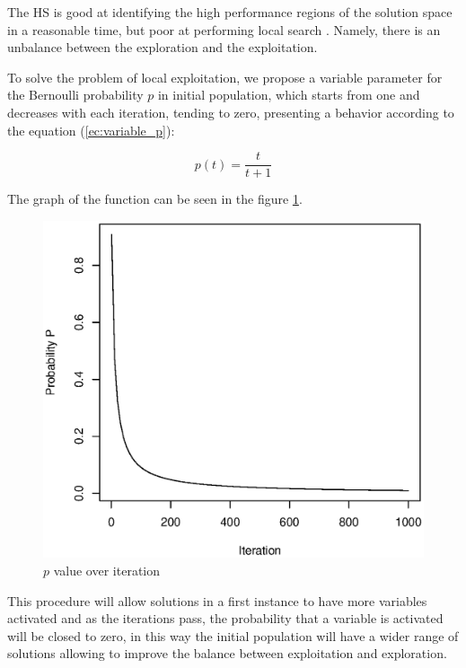 The HS is good at identifying the high performance regions of the solution space in a reasonable time, but poor at performing local search \cite{DBLP:journals/eswa/XiangALHZ14}. Namely, there is an unbalance between the exploration and the exploitation. 
 
To solve the problem of local exploitation, we propose a variable parameter for the Bernoulli probability $p$ in initial population, which starts from one and decreases with each iteration, tending to zero, presenting a behavior according to the equation (\ref{ec:variable_p}):

\begin{equation} \label{ec:variable_p} 
p(t) = \frac{t}{t+1}
\end{equation}	

The graph of the function can be seen in the figure \ref{fig:pvalue}.\\

\begin{figure}[H]
\centering
\includegraphics[scale=.35]{Implementacion/img/p_bernoulli.eps}
\caption{$p$ value over iteration}
\label{fig:pvalue}
\end{figure}

This procedure will allow solutions in a first instance to have more variables activated and as the iterations pass, the probability that a variable is activated will be closed to zero, in this way the initial population will have a wider range of solutions allowing to improve the balance between exploitation and exploration.

